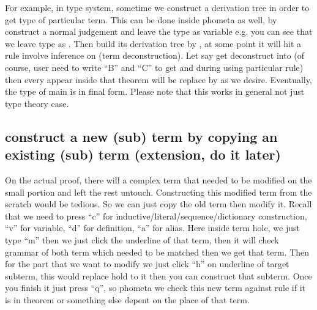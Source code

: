For example, in type system, sometime we construct a derivation tree in order to get type of particular term. This can be done inside phometa as well, by construct a normal judgement and leave the type as variable e.g.  you can see that we leave type as . Then build its derivation tree by \kTheorem, at some point it will hit a rule involve inference on  (term deconstruction). Let say  get deconstruct into  (of course, user need to write ``B'' and ``C'' to get  and  during using particular rule) then every  appear inside that theorem will be replace by  as we desire. Eventually, the type of main is in final form. Please note that this works in general not just type theory case.

\subsection{construct a new (sub) term by copying an existing (sub) term (extension, do it later)}

On the actual proof, there will a complex term that needed to be modified on the small portion and left the rest untouch. Constructing this modified term from the scratch would be tedious. So we can just copy the old term then modify it. Recall that we need to press ``c'' for inductive/literal/sequence/dictionary construction, ``v'' for variable, ``d'' for definition, ``a'' for alias. Here inside term hole, we just type ``m'' then we just click the underline of that term, then it will check grammar of both term which needed to be matched then we get that term. Then for the part that we want to modify we just click ``h'' on underline of target subterm, this would replace hold to it then you can construct that subterm. Once you finish it just press ``q'', so phometa we check this new term against rule if it is in theorem or something else depent on the place of that term.